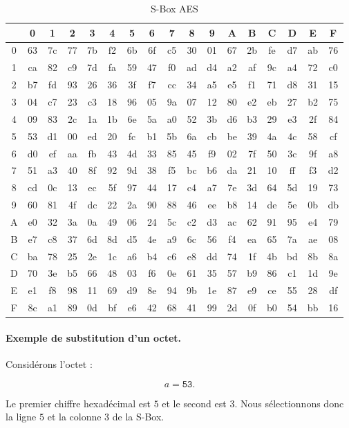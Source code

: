 \documentclass[12pt,a4paper]{article}
\begin{document}
\begin{table}[H]
\centering
\caption{S-Box AES}
\renewcommand{\arraystretch}{1.15}
\setlength{\tabcolsep}{4.5pt}

\begin{tabular}{c|cccccccccccccccc}
 &0&1&2&3&4&5&6&7&8&9&A&B&C&D&E&F\\
\hline
0&63&7c&77&7b&f2&6b&6f&c5&30&01&67&2b&fe&d7&ab&76\\
1&ca&82&c9&7d&fa&59&47&f0&ad&d4&a2&af&9c&a4&72&c0\\
2&b7&fd&93&26&36&3f&f7&cc&34&a5&e5&f1&71&d8&31&15\\
3&04&c7&23&c3&18&96&05&9a&07&12&80&e2&eb&27&b2&75\\
4&09&83&2c&1a&1b&6e&5a&a0&52&3b&d6&b3&29&e3&2f&84\\
5&53&d1&00&ed&20&fc&b1&5b&6a&cb&be&39&4a&4c&58&cf\\
6&d0&ef&aa&fb&43&4d&33&85&45&f9&02&7f&50&3c&9f&a8\\
7&51&a3&40&8f&92&9d&38&f5&bc&b6&da&21&10&ff&f3&d2\\
8&cd&0c&13&ec&5f&97&44&17&c4&a7&7e&3d&64&5d&19&73\\
9&60&81&4f&dc&22&2a&90&88&46&ee&b8&14&de&5e&0b&db\\
A&e0&32&3a&0a&49&06&24&5c&c2&d3&ac&62&91&95&e4&79\\
B&e7&c8&37&6d&8d&d5&4e&a9&6c&56&f4&ea&65&7a&ae&08\\
C&ba&78&25&2e&1c&a6&b4&c6&e8&dd&74&1f&4b&bd&8b&8a\\
D&70&3e&b5&66&48&03&f6&0e&61&35&57&b9&86&c1&1d&9e\\
E&e1&f8&98&11&69&d9&8e&94&9b&1e&87&e9&ce&55&28&df\\
F&8c&a1&89&0d&bf&e6&42&68&41&99&2d&0f&b0&54&bb&16
\end{tabular}
\end{table}



\paragraph{Exemple de substitution d'un octet.}

Considérons l'octet :

\[
a=\texttt{53}.
\]

Le premier chiffre hexadécimal est $5$ et le second est $3$.
Nous sélectionnons donc la ligne $5$ et la colonne $3$ de la S-Box.
\end{document}
